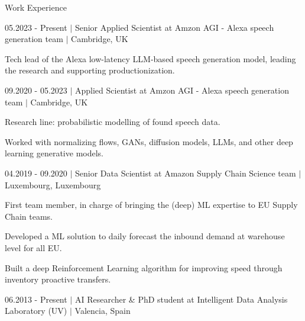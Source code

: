 \documentclass{resume} %
\begin{document}
\begin{rSection}{Work Experience} \itemsep -1pt
	
\begin{rSubsection}{05.2023 - Present $|$ Senior Applied Scientist at Amzon AGI - Alexa speech generation team  $|$  \textnormal{Cambridge, UK}}{}{}

	\vspace{-3pt}
	
	\item Tech lead of the Alexa low-latency LLM-based speech generation model, leading the research and supporting productionization.

\end{rSubsection}

\begin{rSubsection}{09.2020 - 05.2023 $|$ Applied Scientist at Amzon AGI - Alexa speech generation team  $|$  \textnormal{Cambridge, UK}}{}{}
	
	\vspace{-3pt}
	
	\item Research line: probabilistic modelling of found speech data.
	\item Worked with normalizing flows, GANs, diffusion models, LLMs, and other deep learning generative models.

\end{rSubsection}

\begin{rSubsection}{04.2019 - 09.2020 $|$ Senior Data Scientist at Amazon Supply Chain Science team  $|$  \textnormal{Luxembourg, Luxembourg}}{}{}

	\vspace{-3pt}

	\item First team member, in charge of bringing the (deep) ML expertise to EU Supply Chain teams.
	\item Developed a ML solution to daily forecast the inbound demand at warehouse level for all EU.
	\item Built a deep Reinforcement Learning algorithm for improving speed through inventory proactive transfers.
	
\end{rSubsection}

\vspace{-6pt}

\begin{rSubsection}{06.2013 - Present $|$ AI Researcher \& PhD student at Intelligent Data Analysis Laboratory (UV) $|$ \textnormal{Valencia, Spain}\hspace{-10pt}}{}{}


\end{rSubsection}
\end{rSection}
\end{document}
